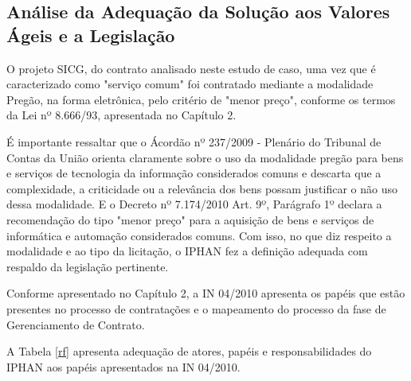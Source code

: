 \subsection[Análise da Adequação da Solução aos Valores Ágeis e a Legislação]{Análise da Adequação da Solução aos Valores Ágeis e a Legislação}

O projeto SICG, do contrato analisado neste estudo de caso, uma vez que é caracterizado como "serviço comum" foi contratado mediante a modalidade Pregão, na forma eletrônica, pelo critério de "menor preço", conforme os termos da Lei nº 8.666/93, apresentada no Capítulo 2.

É importante ressaltar que o Ácordão nº 237/2009 - Plenário do Tribunal de Contas da União orienta claramente sobre o uso da modalidade pregão para bens e serviços de tecnologia da informação considerados comuns e descarta que a complexidade, a criticidade ou a relevância dos bens possam justificar o não uso dessa modalidade.  E o Decreto nº 7.174/2010 Art. 9º, Parágrafo 1º declara a recomendação do tipo "menor preço" para a aquisição de bens e serviços de informática e automação considerados comuns. Com isso, no que diz respeito a modalidade e ao tipo da licitação, o IPHAN fez a definição adequada com respaldo da legislação pertinente. 

Conforme apresentado no Capítulo 2, a IN 04/2010 apresenta os papéis que estão presentes no processo de contratações e o mapeamento do processo da fase de Gerenciamento de Contrato. 

A Tabela \ref{rf} apresenta adequação de atores, papéis e responsabilidades do IPHAN aos papéis apresentados na IN 04/2010.


